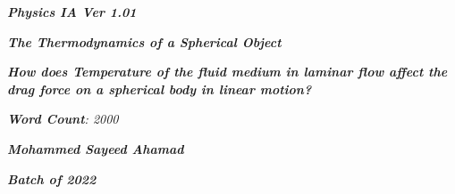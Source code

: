 

\begin{titlepage}
    \begin{center}
        \vspace*{1cm}
            
        \date{}
            
        \huge
            
        \textit{\textbf{Physics IA Ver 1.01}}
            
        \vspace{0.25cm}
            
        \hline
            
        \vspace{2.5cm}
            
        \textit{\textbf{The Thermodynamics of a Spherical Object}}
            
        \vspace{1cm}
            
        \LARGE
            
        \textit{\textbf{How does Temperature of the fluid medium in laminar flow affect the drag force on a spherical body in linear motion? }}
            
        \vspace{2.5cm}
            
        \Large
            
		\textit{\textbf{Word Count}: 2000}            

		\vspace{1cm}            
            
		\Large		
		            
        \textit{\textbf{Mohammed Sayeed Ahamad}}
            
        \vspace{2cm}
            
        \Large
            
        \textit{\textbf{Batch of 2022}}
            
        \vspace{0.25cm}
            
        \hline
           
            
    \end{center}
\end{titlepage}




